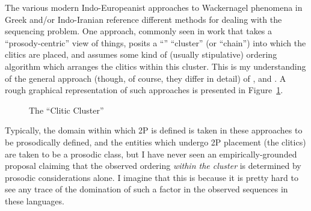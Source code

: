 \documentclass[output=paper,
modfonts
]{LSP/langsci}
\begin{document}
The various modern Indo-Europeanist approaches to Wackernagel phenomena in Greek and/or Indo-Iranian
reference different methods for dealing with the sequencing problem. One approach, commonly seen
in work that takes a ``prosody-centric'' view of things, posits a ``'' 
``cluster'' (or ``chain'') into which the clitics are placed, and assumes some kind of (usually 
stipulative) ordering algorithm which arranges the clitics within this cluster. This is
my understanding of the general approach (though, of course, they differ in detail)
of \citet{keydana2011}, \citet{lowe2014} and \citet{goldstein2016}. A rough graphical representation of such
approaches is presented in Figure~\ref{figure1}.

\begin{figure}%
\begin{center}
\end{center}
\caption{The ``Clitic Cluster''}\label{figure1}
\end{figure}

Typically, the domain within which 2P is defined is taken in these approaches to be
prosodically defined, and the entities which undergo 2P placement (the clitics) are taken to be
a prosodic class, but I have never seen an empirically-grounded proposal claiming 
that the observed ordering \textit{within
the  cluster} is determined by prosodic considerations alone. I imagine that this is because it is pretty hard
to see any trace of the domination of such a factor in the observed  sequences in these languages.
\end{document}
